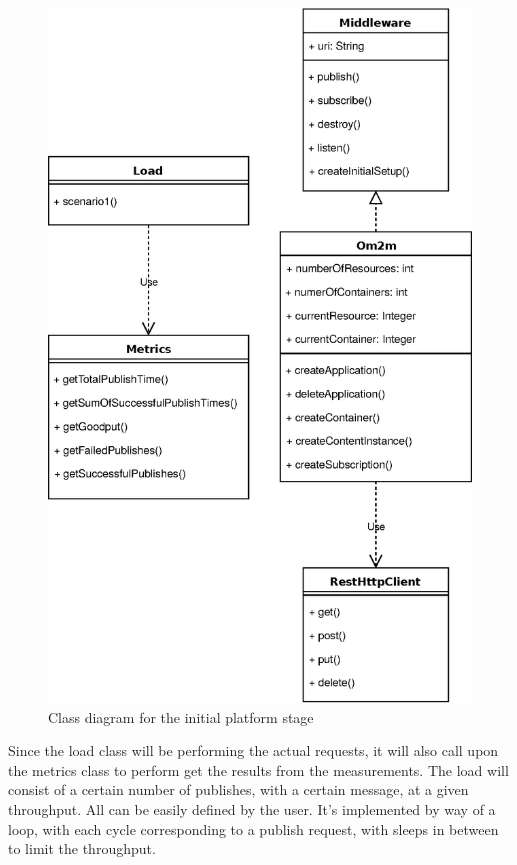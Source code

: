 \documentclass[conference]{IEEEtran}
\begin{document}
\begin{figure}[htbp!]
  \centering
  \includegraphics[width=\linewidth]{figures/class_diagram.eps}
  \caption{Class diagram for the initial platform stage}
  \label{fig:class_diagram_om2m}
\end{figure}

Since the load class will be performing the actual requests, it will also call upon the metrics class to perform get the results from the measurements. The load will consist of a certain number of publishes, with a certain message, at a given throughput. All can be easily defined by the user. It's implemented by way of a loop, with each cycle corresponding to a publish request, with sleeps in between to limit the throughput.
\end{document}

